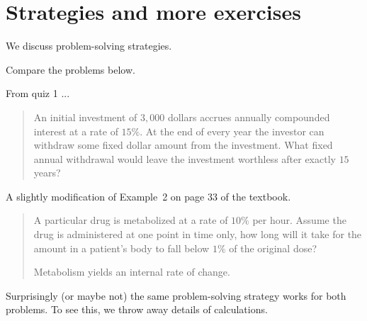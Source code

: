 \documentclass[../main.tex]{subfiles}
\begin{document}
 \section{Strategies and more exercises}

We discuss problem-solving strategies.  
\clearpage

\begin{example} \label{ex:strategy-connection}
  Compare the problems below.

  From quiz 1 ...
  \begin{quote}
    An initial investment of \(3,000\) dollars accrues annually compounded interest at a rate of \(15\%\). At the end of every year the investor can withdraw some fixed dollar amount from the investment. What fixed annual withdrawal would leave the investment worthless after exactly \(15\) years?
  \end{quote}

  A slightly modification of Example~2 on page 33 of the textbook.
  \begin{quote}
    A particular drug is metabolized at a rate of \(10\%\) per hour. Assume the drug is administered at one point in time only, how long will it take for the amount in a patient's body to fall below \(1\%\) of the original dose?

    Metabolism yields an internal rate of change.
  \end{quote}

  Surprisingly (or maybe not) the same problem-solving strategy works for both problems.  To see this, we throw away details of calculations.

\end{example}
\clearpage
\end{document}
